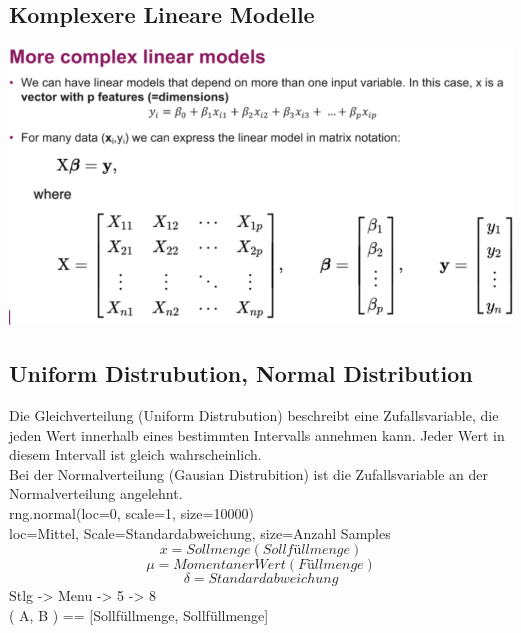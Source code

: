 \subsection{Komplexere Lineare Modelle}
\includegraphics[width=\linewidth]{img/komplexere_lineare_modelle.png}
\subsection{Uniform Distrubution, Normal Distribution}
Die Gleichverteilung (Uniform Distrubution) beschreibt eine Zufallsvariable, die jeden Wert innerhalb eines bestimmten
Intervalls annehmen kann. Jeder Wert in diesem Intervall ist gleich wahrscheinlich.\\
Bei der Normalverteilung (Gausian Distrubition) ist die Zufallsvariable an der Normalverteilung angelehnt.\\
rng.normal(loc=0, scale=1, size=10000)\\
loc=Mittel, Scale=Standardabweichung, size=Anzahl Samples
$$x = Sollmenge (Sollfüllmenge)$$
$$ \mu = Momentaner Wert (Füllmenge)$$
$$ \delta = Standardabweichung $$
Stlg -> Menu -> 5 -> 8\\
( A, B ) == [Sollfüllmenge, Sollfüllmenge]
